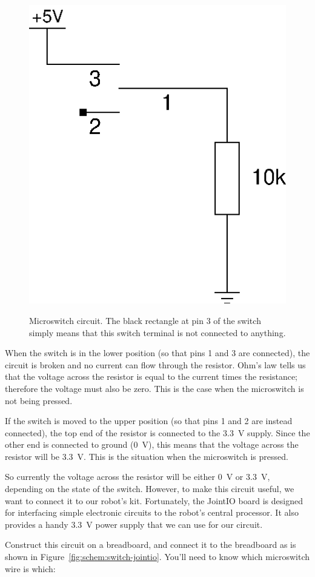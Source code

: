 \documentclass{article}
\begin{document}
\begin{figure}[h]
\centering
\includegraphics[width=.5\textwidth]{assets/fig/schem/switch}
\label{fig:schem:switch}
\caption{Microswitch circuit. The black rectangle at pin 3 of the switch simply
means that this switch terminal is not connected to anything.}
\end{figure}

When the switch is in the lower position (so that pins 1 and 3 are connected),
the circuit is broken and no current can flow through the resistor. Ohm's law
tells us that the voltage across the resistor is equal to the current times the
resistance; therefore the voltage must also be zero. This is the case when the
microswitch is not being pressed.

If the switch is moved to the upper position (so that pins 1 and 2 are instead
connected), the top end of the resistor is connected to the \SI{3.3}{\volt}
supply. Since the other end is connected to ground (\SI{0}{\volt}), this means
that the voltage across the resistor will be \SI{3.3}{\volt}. This is the
situation when the microswitch is pressed.

So currently the voltage across the resistor will be either \SI{0}{\volt} or
\SI{3.3}{\volt}, depending on the state of the switch. However, to make this
circuit useful, we want to connect it to our robot's kit. Fortunately, the
JointIO board is designed for interfacing simple electronic circuits to the
robot's central processor. It also provides a handy \SI{3.3}{\volt} power supply
that we can use for our circuit.

Construct this circuit on a breadboard, and connect it to the breadboard as is
shown in Figure~\ref{fig:schem:switch-jointio}. You'll need to know which
microswitch wire is which: 
\end{document}
